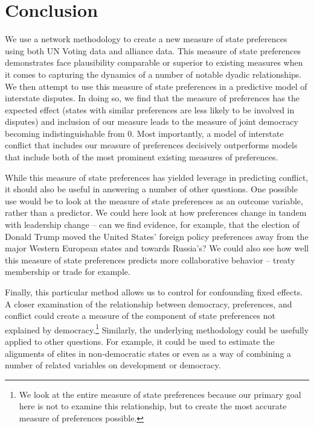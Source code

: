 \section*{Conclusion}

We use a network methodology to create a new measure of state preferences using both UN Voting data and alliance data. This measure of state preferences demonstrates face plausibility comparable or superior to existing measures when it comes to capturing the dynamics of a number of notable dyadic relationships. We then attempt to use this measure of state preferences in a predictive model of interstate disputes. In doing so, we find that the measure of preferences has the expected effect (states with similar preferences are less likely to be involved in disputes) and inclusion of our measure leads to the measure of joint democracy becoming indistinguishable from $0$. Most importantly, a model of interstate conflict that includes our measure of preferences decisively outperforms models that include both of the most prominent existing measures of preferences.


While this measure of state preferences has yielded leverage in predicting conflict, it should also be useful in answering a number of other questions. One possible use would be to look at the measure of state preferences as an outcome variable, rather than a predictor. We could here look at how preferences change in tandem with leadership change -- can we find evidence, for example, that the election of Donald Trump moved the United States' foreign policy preferences away from the major Western European states and towards Russia's? We could also see how well this measure of state preferences predicts more collaborative behavior -- treaty membership or trade for example.

Finally, this particular method allows us to control for confounding fixed effects. A closer examination of the relationship between democracy, preferences, and conflict could create a measure of the component of state preferences not explained by democracy.\footnote{We look at the entire measure of state preferences because our primary goal here is not to examine this relationship, but to create the most accurate measure of preferences possible.}  Similarly, the underlying methodology could be usefully applied to other questions. For example, it could be used to estimate the alignments of elites in non-democratic states  or even as a way of combining a number of related variables on development or democracy. 

